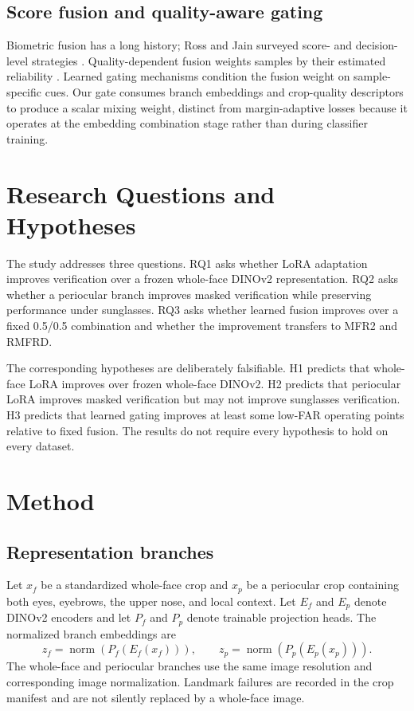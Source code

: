 \documentclass[10pt,journal,compsoc]{IEEEtran}
\begin{document}
\subsection{Score fusion and quality-aware gating}
Biometric fusion has a long history; Ross and Jain surveyed score- and decision-level strategies \cite{fusionRossJain}. Quality-dependent fusion weights samples by their estimated reliability \cite{quality}. Learned gating mechanisms condition the fusion weight on sample-specific cues. Our gate consumes branch embeddings and crop-quality descriptors to produce a scalar mixing weight, distinct from margin-adaptive losses \cite{magface,adaface} because it operates at the embedding combination stage rather than during classifier training.

\section{Research Questions and Hypotheses}
The study addresses three questions. RQ1 asks whether LoRA adaptation improves verification over a frozen whole-face DINOv2 representation. RQ2 asks whether a periocular branch improves masked verification while preserving performance under sunglasses. RQ3 asks whether learned fusion improves over a fixed 0.5/0.5 combination and whether the improvement transfers to MFR2 and RMFRD.

The corresponding hypotheses are deliberately falsifiable. H1 predicts that whole-face LoRA improves over frozen whole-face DINOv2. H2 predicts that periocular LoRA improves masked verification but may not improve sunglasses verification. H3 predicts that learned gating improves at least some low-FAR operating points relative to fixed fusion. The results do not require every hypothesis to hold on every dataset.

\section{Method}
\subsection{Representation branches}
Let $x_f$ be a standardized whole-face crop and $x_p$ be a periocular crop containing both eyes, eyebrows, the upper nose, and local context. Let $E_f$ and $E_p$ denote DINOv2 encoders and let $P_f$ and $P_p$ denote trainable projection heads. The normalized branch embeddings are
\begin{equation}
 z_f=\operatorname{norm}(P_f(E_f(x_f))),\qquad z_p=\operatorname{norm}(P_p(E_p(x_p))).
\end{equation}
The whole-face and periocular branches use the same image resolution and corresponding image normalization. Landmark failures are recorded in the crop manifest and are not silently replaced by a whole-face image.
\end{document}
